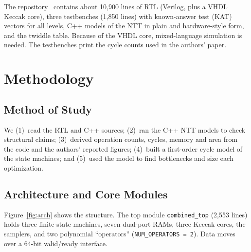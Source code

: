 \documentclass[12pt,a4paper]{report}
\newcommand{\code}[1]{\texttt{#1}}
\begin{document}
The repository~\cite{repo} contains about 10{,}900 lines of RTL (Verilog, plus a VHDL Keccak core), three testbenches (1{,}850 lines) with known-answer test (KAT) vectors for all levels, C++ models of the NTT in plain and hardware-style form, and the twiddle table. Because of the VHDL core, mixed-language simulation is needed. The testbenches print the cycle counts used in the authors' paper.

\chapter{Methodology}
\section{Method of Study}
We (1)~read the RTL and C++ sources; (2)~ran the C++ NTT models to check structural claims; (3)~derived operation counts, cycles, memory and area from the code and the authors' reported figures; (4)~built a first-order cycle model of the state machines; and (5)~used the model to find bottlenecks and size each optimization.

\section{Architecture and Core Modules}
Figure~\ref{fig:arch} shows the structure. The top module \code{combined\_top} (2{,}553 lines) holds three finite-state machines, seven dual-port RAMs, three Keccak cores, the samplers, and two polynomial ``operators'' (\code{NUM\_OPERATORS = 2}). Data moves over a 64-bit valid/ready interface.
\end{document}
